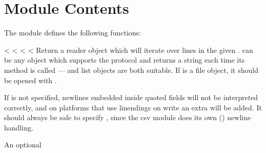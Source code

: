 \documentclass[letterpaper,10pt,english]{sphinxmanual}
\begin{document}
\section{Module Contents}
\label{\detokenize{csv:module-contents}}\label{\detokenize{csv:csv-contents}}
The {\hyperref[\detokenize{csv:module-csv}]{}} module defines the following functions:

\ignorespaces {}

\vspace{5px}

\begin{fulllineitems}
\label{\detokenize{csv:csv.reader}}
<%
\pysigstartsignatures
<%
<%
<%
Return a reader object which will iterate over lines in the given .
 can be any object which supports the  protocol and returns a
string each time its  method is called —  and list objects are both suitable.   If  is a file object,
it should be opened with .
\begin{footnote}[1]\sphinxAtStartFootnote
If  is not specified, newlines embedded inside quoted fields
will not be interpreted correctly, and on platforms that use  linendings
on write an extra  will be added.  It should always be safe to specify
, since the csv module does its own
() newline handling.
%
\end{footnote}  An optional

\end{fulllineitems}
\end{document}

